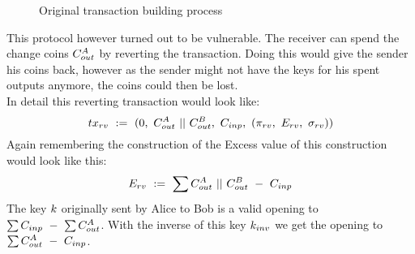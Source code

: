 \begin{figure}
    \label{fig:txorg}
    \centering
    \caption{Original transaction building process}
\end{figure}
This protocol however turned out to be vulnerable. The receiver can spend the change coins $C_{out}^A$ by reverting the transaction. Doing this would give the sender his coins back, however as the sender
might not have the keys for his spent outputs anymore, the coins could then be lost.\\
In detail this reverting transaction would look like:
\[ tx_{rv} ~:=~ (0 ,~ C_{out}^A ~||~ C_{out}^B ,~ C_{inp} ,~ (\pi_{rv} ,~ E_{rv} ,~ \sigma_{rv}) ) \]
Again remembering the construction of the Excess value of this construction would look like this:
\[ E_{rv} ~:=~ \sum{C_{out}^A ~||~C_{out}^B ~-~C_{inp}} \]
The key $k$ originally sent by Alice to Bob is a valid opening to $\sum{C_{inp}} ~-~ \sum{C_{out}^A}$. With the inverse of this key $k_{inv}$ we get the opening to $\sum{C_{out}^A ~-~C_{inp}}$.
